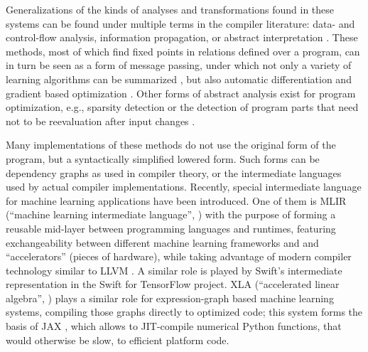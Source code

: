 Generalizations of the kinds of analyses and transformations found in these systems can be found
under multiple terms in the compiler literature: data- and control-flow analysis, information
propagation, or abstract interpretation \parencite{muchnick1997advanced,singer2018static}.  These
methods, most of which find fixed points in relations defined over a program, can in turn be seen as
a form of message passing, under which not only a variety of learning algorithms can be summarized
\parencite{minka2005divergence}, but also automatic differentiation \parencite{minka2019automatic}
and gradient based optimization \parencite{dauwels2005steepest}.  Other forms of abstract analysis
exist for program optimization, e.g., sparsity detection \parencite{gowda2019sparsity} or the
detection of program parts that need not to be reevaluation after input changes
\parencite{becker2020dynamic}.

Many implementations of these methods do not use the original form of the program, but a
syntactically simplified lowered form.  Such forms can be dependency graphs as used in compiler
theory, or the intermediate languages used by actual compiler implementations.  Recently, special
intermediate language for machine learning applications have been introduced.  One of them is MLIR
(\enquote{machine learning intermediate language}, \textcite{lattner2020mlir}) with the purpose of
forming a reusable mid-layer between programming languages and runtimes, featuring exchangeability
between different machine learning frameworks and and \enquote{accelerators} (pieces of hardware),
while taking advantage of modern compiler technology similar to LLVM
\parencite{llvmproject2019llvm}.  A similar role is played by Swift's intermediate representation in
the Swift for TensorFlow project.  XLA (\enquote{accelerated linear algebra}, \textcite{xla2020})
plays a similar role for expression-graph based machine learning systems, compiling those graphs
directly to optimized code; this system forms the basis of JAX \parencite{bradbury2018jax}, which
allows to JIT-compile numerical Python functions, that would otherwise be slow, to efficient
platform code.

